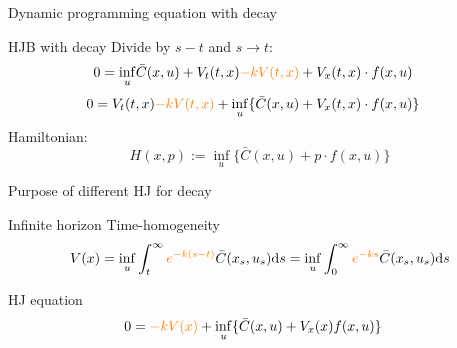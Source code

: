 \documentclass[color=usenames,dvipsnames]{beamer}
\newcommand{\ds}{\text{\normalfont d}s}
\begin{document}
\begin{frame}{Dynamic programming equation with decay}
        \begin{block}
        {HJB with decay}
        Divide by $s-t$ and $s\to t$:
        \[
        \begin{split}
            0=\inf_{u} &\bar{C}(x,u) + V_t(t,x) {\color{orange}- k V(t,x)}+ V_x(t,x)\cdot f(x,u)
        \end{split}
        \]
        \[
        \begin{split}
            0= V_t(t,x) {\color{orange}- k V(t,x)}+\inf_{u} &\{\bar{C}(x,u) + V_x(t,x)\cdot f(x,u)\}
        \end{split}
        \]
        Hamiltonian: 
        \[
        H(x,p):= \inf_{u} \{\bar{C}(x,u) + p\cdot f(x,u)\}
        \]
    \end{block}
\end{frame}
\begin{frame}{Purpose of different HJ for decay}
    \begin{block}
        {Infinite horizon}
        Time-homogeneity
        \[
        V(x)=\inf_{u}\int_t^\infty {\color{orange}e^{-k(s-t)}}\bar{C}(x_s,u_s)\ds=\inf_{u}\int_0^\infty {\color{orange}e^{-ks}}\bar{C}(x_s,u_s)\ds
        \]
    \end{block}
    \begin{block}
        {HJ equation}
        \[
        \begin{split}
            0= {\color{orange}- k V(x)}+\inf_{u} &\{\bar{C}(x,u) + V_x(x)f(x,u)\}
        \end{split}
        \]
    \end{block}
\end{frame}
\end{document}
